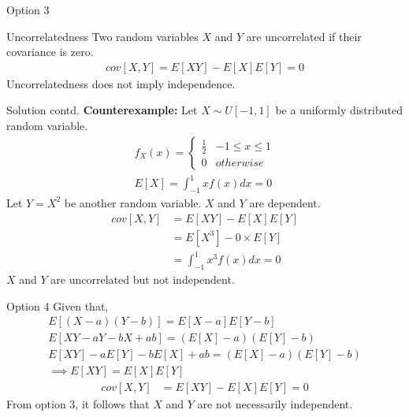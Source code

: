 \documentclass{beamer}
\providecommand{\brak}[1]{\ensuremath{\left(#1\right)}}
\providecommand{\sbrak}[1]{\ensuremath{{}\left[#1\right]}}
\begin{document}
\begin{frame}{Option 3}
\begin{block}{Uncorrelatedness}
    Two random variables $X$ and $Y$ are uncorrelated if their covariance is zero.
    \begin{align}
        cov\sbrak{X,Y}=E\sbrak{XY}-E\sbrak{X}E\sbrak{Y}=0
    \end{align}
    Uncorrelatedness does not imply independence.
\end{block}
\end{frame}
\begin{frame}{Solution contd.}
    \textbf{Counterexample:} Let $X\sim U \sbrak{-1,1}$ be a uniformly distributed random variable.
    \begin{align}
        f_X\brak{x}=
        \begin{cases}
        \frac{1}{2} & -1\leq x \leq 1\\
        0 & otherwise
        \end{cases}\\
        E\sbrak{X}=\int_{-1}^{1}x f\brak{x} dx=0
    \end{align}
    Let $Y=X^2$ be another random variable.
    $X$ and $Y$ are dependent.
    \begin{align}
        cov\sbrak{X,Y}&=E\sbrak{XY}-E\sbrak{X}E\sbrak{Y}\\
        &=E\sbrak{X^3}-0\times E\sbrak{Y}\\
        &=\int_{-1}^{1}x^3 f\brak{x} dx=0
    \end{align}
    $X$ and $Y$ are uncorrelated but not independent.
\end{frame}
\begin{frame}{Option 4}
    Given that,
    \begin{align}
        E\sbrak{\brak{X-a}\brak{Y-b}}=E\sbrak{X-a}E\sbrak{Y-b}\\
        E\sbrak{XY-aY-bX+ab}=\brak{E\sbrak{X}-a}\brak{E\sbrak{Y}-b}\\
        E\sbrak{XY}-aE\sbrak{Y}-bE\sbrak{X}+ab = \brak{E\sbrak{X}-a}\brak{E\sbrak{Y}-b}\\
        \implies E\sbrak{XY} = E\sbrak{X}E\sbrak{Y}
    \end{align}
    \begin{align}
        cov\sbrak{X,Y}&=E\sbrak{XY}-E\sbrak{X}E\sbrak{Y}=0
    \end{align}
    From option 3, it follows that $X$ and $Y$ are not necessarily independent.
\end{frame}
\end{document}
